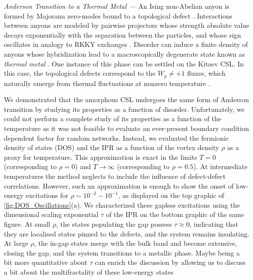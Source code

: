 \documentclass[%
 reprint,
superscriptaddress,
 amsmath,amssymb,
aps,
]{revtex4-2}
\begin{document}
{\it Anderson Transition to a Thermal Metal ---} 
An Ising non-Abelian anyon is formed by Majorana zero-modes bound to a topological defect \cite{Beenakker2013}. Interactions between anyons are modeled by pairwise projectors whose strength absolute value decays exponentially with the separation between the particles, and whose sign oscillates in analogy to RKKY exchanges \cite{Laumann2012,Lahtinen_2011,lahtinenTopologicalLiquidNucleation2012}. Disorder can induce a finite density of anyons whose hybridization lead to a macroscopically degenerate state known as \emph{thermal metal} \cite{Laumann2012}. One instance of this phase can be settled on the Kitaev CSL. In this case, the topological defects correspond to the $W_p \neq +1$ fluxes, which naturally emerge from thermal fluctuations at nonzero temperature \cite{selfThermallyInducedMetallic2019}.  \par
We demonstrated that the amorphous CSL undergoes the same form of Anderson transition by studying its properties as a function of disorder. Unfortunately, we could not perform a complete study of its properties as a function of the temperature as it was not feasible to evaluate an ever-present boundary condition dependent factor \cite{pedrocchiPhysicalSolutionsKitaev2011,Zschocke_Physical_states2015} for random networks. Instead, we evaluated the fermionic density of states (DOS) and the IPR as a function of the vortex density $\rho$ as a proxy for temperature. This approximation is exact in the limits $T = 0$ (corresponding to $\rho = 0$) and $T \to \infty$ (corresponding to $\rho = 0.5$). At intermediate temperatures the method neglects to include the influence of defect-defect correlations. However, such an approximation is enough to show the onset of low-energy excitations for $\rho \sim 10^{-2}-10^{-1}$, as displayed on the top graphic of \ref{fig:DOS_Oscillations}(a). We characterized these gapless excitations using the dimensional scaling exponential $\tau$ of the IPR on the bottom graphic of the same figure. At small $\rho$, the states populating the gap possess $\tau\approx0$, indicating that they are localised states pinned to the defects, and the system remains insulating. At large $\rho$, the in-gap states merge with the bulk band and become extensive, closing the gap, and the system transitions to a metallic phase. {\color{red} Maybe being a bit more quantitative about $\tau$ can enrich the discussion by allowing us to discuss a bit about the multifractality of these low-energy states}  \par
\end{document}
